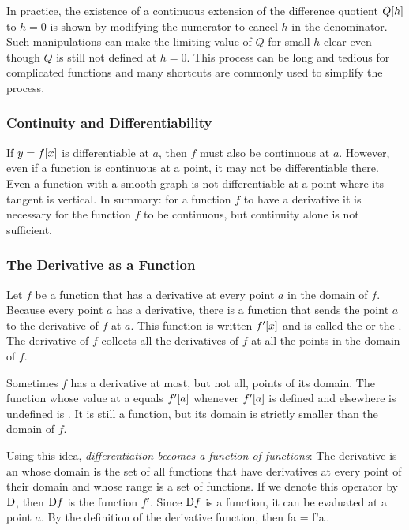 In practice, the existence of a continuous extension of the difference quotient $Q\!\left[{h}\right]$ to $h = 0$ is shown by modifying the numerator to cancel $h$ in the denominator. Such manipulations can make the limiting value of $Q$ for small $h$ clear even though $Q$ is still not defined at $h = 0$. This process can be long and tedious for complicated functions and many shortcuts are commonly used to simplify the process.


\subsubsection{Continuity and Differentiability}
If $y = f\!\left[{x}\right]$ is differentiable at $a$, then $f$ must also be continuous at $a$. However, even if a function is continuous at a point, it may not be differentiable there. Even a function with a smooth graph is not differentiable at a point where its tangent is vertical. In summary: for a function $f$ to have a derivative it is necessary for the function $f$ to be continuous, but continuity alone is not sufficient.


\subsubsection{The Derivative as a Function}
Let $f$ be a function that has a derivative at every point $a$ in the domain of $f$. Because every point $a$ has a derivative, there is a function that sends the point $a$ to the derivative of $f$ at $a$. This function is written $f'\!\left[{x}\right]$ and is called the  or the . The derivative of $f$ collects all the derivatives of $f$ at all the points in the domain of $f$.

Sometimes $f$ has a derivative at most, but not all, points of its domain. The function whose value at a equals $f'\!\left[{a}\right]$ whenever $f'\!\left[{a}\right]$ is defined and elsewhere is undefined is . It is still a function, but its domain is strictly smaller than the domain of $f$.

Using this idea, \emph{differentiation becomes a function of functions}: The derivative is an  whose domain is the set of all functions that have derivatives at every point of their domain and whose range is a set of functions. If we denote this operator by $\mathrm{D}$, then $\mathrm{D} f$ is the function $f'$. Since $\mathrm{D} f$ is a function, it can be evaluated at a point $a$. By the definition of the derivative function, then 
\beq
\fder f\vat a = f'\vat a\,.
\eeq

